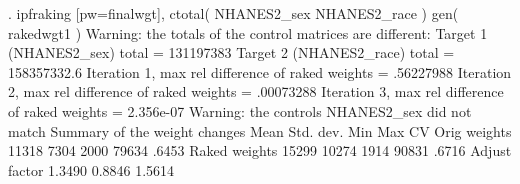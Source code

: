 . ipfraking [pw=finalwgt], ctotal( NHANES2_sex NHANES2_race ) gen( rakedwgt1 )
{\smallskip}
Warning: the totals of the control matrices are different:
   Target 1 (NHANES2_sex) total              =            131197383
   Target 2 (NHANES2_race) total             =          158357332.6
{\smallskip}
 Iteration 1, max rel difference of raked weights = .56227988
 Iteration 2, max rel difference of raked weights = .00073288
 Iteration 3, max rel difference of raked weights = 2.356e-07
Warning: the controls NHANES2_sex did not match
{\smallskip}
   Summary of the weight changes
{\smallskip}
              {\VBAR}    Mean    Std. dev.    Min        Max       CV
Orig weights  {\VBAR}    11318       7304      2000       79634   .6453
Raked weights {\VBAR}    15299      10274      1914       90831   .6716
Adjust factor {\VBAR}   1.3490               0.8846      1.5614
{\smallskip}
